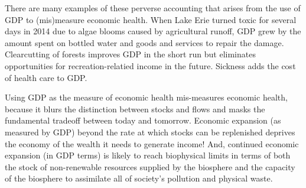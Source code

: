 There are many examples of these perverse accounting that arises from 
the use of GDP to (mis)measure economic health.
When Lake Erie turned toxic for several days in 2014 
due to algae blooms caused by agricultural runoff, 
GDP grew by the amount spent on bottled water and goods and services to repair the damage.
Clearcutting of forests improves GDP in the short run but eliminates 
opportunities for recreation-relatied income in the future.
Sickness adds the cost of health care to GDP.

Using GDP as the measure of economic health 
mis-measures economic health, 
because it blurs the distinction between stocks and flows
and masks the fundamental tradeoff
between today and tomorrow.
Economic expansion (as measured by GDP) 
beyond the rate at which stocks can be replenished 
deprives the economy 
of the wealth it needs to generate income!
And, continued economic expansion (in GDP terms)
is likely to reach biophysical limits in terms of both 
the stock of non-renewable resources supplied by the biosphere
and the capacity of the biosphere to assimilate 
all of society's pollution and physical waste. 









